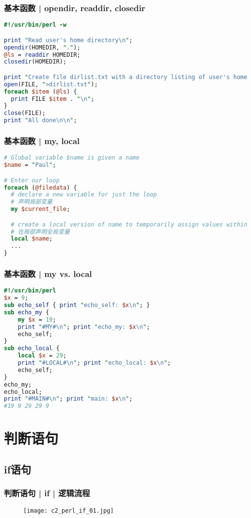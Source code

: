 \begin{frame}[fragile]
  \frametitle{基本函数 | opendir, readdir, closedir}
  \vspace{-1.5em}
\begin{lstlisting}[language=Perl]
#!/usr/bin/perl -w

print "Read user's home directory\n";
opendir(HOMEDIR, ".");
@ls = readdir HOMEDIR;
closedir(HOMEDIR);

print "Create file dirlist.txt with a directory listing of user's home dir\n";
open(FILE, ">dirlist.txt");
foreach $item (@ls) {
  print FILE $item . "\n";
}
close(FILE);
print "All done\n\n";
\end{lstlisting}
\end{frame}

\begin{frame}[fragile]
  \frametitle{基本函数 | \alert{my}, local}
  \vspace{-1.5em}
\begin{lstlisting}[language=Perl]
# Global variable $name is given a name
$name = "Paul";

# Enter our loop
foreach (@filedata) {
  # declare a new variable for just the loop
  # 声明局部变量
  my $current_file;

  # create a local version of name to temporarily assign values within the loop to
  # 在局部声明全局变量
  local $name;
  ...
}
\end{lstlisting}
\end{frame}

\begin{frame}[fragile]
  \frametitle{基本函数 | my vs. local}
  \vspace{-1.5em}
\begin{lstlisting}[language=Perl,basicstyle=\small\tt]
#!/usr/bin/perl
$x = 9;
sub echo_self { print "echo_self: $x\n"; }
sub echo_my {
    my $x = 19;
    print "#MY#\n"; print "echo_my: $x\n";
    echo_self;
}
sub echo_local {
    local $x = 29;
    print "#LOCAL#\n"; print "echo_local: $x\n";
    echo_self;
}
echo_my;
echo_local;
print "#MAIN#\n"; print "main: $x\n";
#19 9 29 29 9
\end{lstlisting}
\end{frame}

\section{判断语句}
\subsection{if语句}
\begin{frame}
  \frametitle{判断语句 | if | 逻辑流程}
  \begin{figure}
    \centering
    \texttt{[image: c2\_perl\_if\_01.jpg]}
  \end{figure}
\end{frame}

